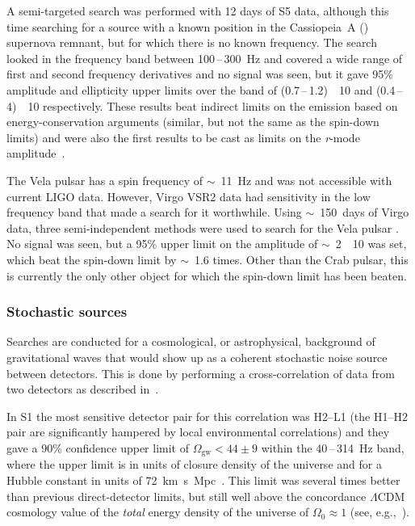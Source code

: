 \documentclass{article}
\begin{document}
A semi-targeted search was performed with 12 days of S5 data, although this time
searching for a source with a known position in the Cassiopeia~A ()
supernova remnant, but for which there is no known frequency. The
search~\cite{Abadie:2010g} looked in the frequency band between
100\,--\,300~Hz and covered a wide range of first and second frequency
derivatives and no signal was seen, but it gave 95\% amplitude and
ellipticity upper limits over the band of
(0.7\,--\,1.2)~\texttimes~10 and
(0.4\,--\,4)~\texttimes~10 respectively. These results beat
indirect limits on the emission based on energy-conservation arguments
(similar, but not the same as the spin-down limits) and were also the
first results to be cast as limits on the \textit{r}-mode amplitude~\cite{Owen:2010}.

The Vela pulsar has a spin frequency of $\sim$~11~Hz and was not accessible with
current LIGO data.  However, Virgo VSR2 data had sensitivity in the low
frequency band that made a search for it worthwhile. Using $\sim$~150~days of
Virgo data, three semi-independent methods were used to search for the
Vela pulsar \cite{Abadie:2011b}. No signal was seen, but a 95\% upper limit on
the amplitude of $\sim$~2~\texttimes~10 was set, which beat the spin-down limit
by $\sim$~1.6 times. Other than the Crab pulsar, this is currently the only other
object for which the spin-down limit has been beaten.

\subsubsection{Stochastic sources}

Searches are conducted for a cosmological, or astrophysical, background of
gravitational waves that would show up as a coherent stochastic noise source
between detectors. This is done by performing a cross-correlation of data from
two detectors as described in~\cite{Allen:1999b}.

In S1 the most sensitive detector pair for this correlation was H2--L1 (the H1--H2
pair are significantly hampered by local environmental correlations) and they
gave a 90\% confidence upper limit of $\Omega_{\mathrm{gw}} < 44\pm9$ within the 40\,--\,314~Hz band, where the upper limit is in
units of closure density of the universe and for a Hubble constant in units of
72~km~s~Mpc~\cite{Abbott:2004e}. This limit was several times
better than previous direct-detector limits, but still well above the
concordance $\Lambda$CDM cosmology value of the \textit{total} energy density of
the universe of $\Omega_0\approx1$ (see, e.g.,~\cite{Jarosik:2010}).
\end{document}
